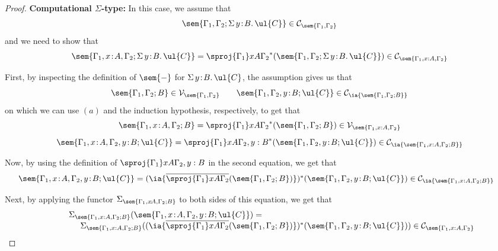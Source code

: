 \begin{proof}
\vspace{0.2cm}
\noindent
\textbf{Computational $\Sigma$-type:}
In this case, we assume that 
\[
\sem{\Gamma_1,\Gamma_2;\Sigma\, y \!:\! B .\, \ul{C}} \in \mathcal{C}_{\sem{\Gamma_1,\Gamma_2}}
\]
and we need to show that
\[
\sem{\Gamma_1, x \!:\! A,\Gamma_2;\Sigma\, y \!:\! B .\, \ul{C}} = \sproj {\Gamma_1} x A {\Gamma_2}^*(\sem{\Gamma_1,\Gamma_2;\Sigma\, y \!:\! B .\, \ul{C}}) \in \mathcal{C}_{\sem{\Gamma_1, x : A,\Gamma_2}}
\]

First, by inspecting the definition of $\sem{-}$ for $\Sigma\, y \!:\! B .\, \ul{C}$, the assumption gives us that 
\[
\sem{\Gamma_1,\Gamma_2;B} \in \mathcal{V}_{\sem{\Gamma_1,\Gamma_2}} 
\qquad
\sem{\Gamma_1,\Gamma_2, y \!:\! B;\ul{C}} \in \mathcal{C}_{\ia {\sem{\Gamma_1,\Gamma_2;B}}}
\]
on which we can use $(a)$ and the induction hypothesis, respectively, to get that
\[
\begin{array}{c}
\sem{\Gamma_1, x \!:\! A,\Gamma_2;B} = \sproj {\Gamma_1} x A {\Gamma_2}^*(\sem{\Gamma_1,\Gamma_2;B}) \in \mathcal{V}_{\sem{\Gamma_1, x : A,\Gamma_2}}
\\[3mm]
\sem{\Gamma_1, x \!:\! A,\Gamma_2, y \!:\! B;\ul{C}} = \sproj {\Gamma_1} x A {\Gamma_2, y : B}^*(\sem{\Gamma_1,\Gamma_2, y \!:\! B;\ul{C}}) \in \mathcal{C}_{\ia {\sem{\Gamma_1, x : A,\Gamma_2; B}}}
\end{array}
\]

Now, by using the definition of $\sproj {\Gamma_1} x A {\Gamma_2, y : B}$ in the second equation, we get that
\[
\begin{array}{c}
\hspace{-0.25cm}
\sem{\Gamma_1, x \!:\! A,\Gamma_2, y \!:\! B;\ul{C}} = (\ia {\overline{\sproj {\Gamma_1} x A {\Gamma_2}}(\sem{\Gamma_1, \Gamma_2;B})})^*(\sem{\Gamma_1,\Gamma_2, y \!:\! B;\ul{C}}) \in \mathcal{C}_{\ia {\sem{\Gamma_1, x : A,\Gamma_2; B}}}
\end{array}
\]

Next, by applying the functor $\Sigma_{\sem{\Gamma_1, x \!:\! A,\Gamma_2;B}}$ to both sides of this equation, we get that
\[
\begin{array}{c}
\hspace{-8cm}
\Sigma_{\sem{\Gamma_1, x : A,\Gamma_2;B}} (\sem{\Gamma_1, x \!:\! A,\Gamma_2, y \!:\! B;\ul{C}}) = 
\\
\hspace{1.5cm}
\Sigma_{\sem{\Gamma_1, x : A,\Gamma_2;B}} ((\ia {\overline{\sproj {\Gamma_1} x A {\Gamma_2}}(\sem{\Gamma_1, \Gamma_2;B})})^*(\sem{\Gamma_1,\Gamma_2, y \!:\! B;\ul{C}})) \in \mathcal{C}_{\sem{\Gamma_1, x : A,\Gamma_2}}
\end{array}
\]



\end{proof}
